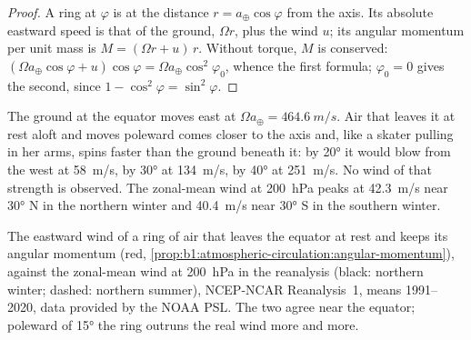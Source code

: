 \begin{proof}
A ring at  $\varphi$ is at the distance $r = a_\oplus\cos\varphi$ from the
axis. Its absolute eastward speed is that of the ground, $\Omega r$, plus the wind
$u$; its angular momentum per unit mass is $M = (\Omega r + u)\,r$. Without torque,
$M$ is conserved: $(\Omega a_\oplus\cos\varphi + u)\cos\varphi = \Omega a_\oplus
\cos^2\varphi_0$, whence the first formula; $\varphi_0 = 0$ gives the second, since
$1 - \cos^2\varphi = \sin^2\varphi$.
\end{proof}

The ground at the equator moves east at $\Omega a_\oplus = \qty{464.6}{m/s}$. Air that
leaves it at rest aloft and moves poleward comes closer to the axis and, like a
skater pulling in her arms, spins faster than the ground beneath it: by
\ang{20} it would blow from the west at \qty{58}{m/s}, by \ang{30} at
\qty{134}{m/s}, by \ang{40} at \qty{251}{m/s}. No wind of that strength is observed.
The zonal-mean wind at \qty{200}{hPa} peaks at \qty{42.3}{m/s} near \ang{30} N in the
northern winter and \qty{40.4}{m/s} near \ang{30} S in the southern winter.

\begin{omfigure}

{\small The eastward wind of a ring of air that leaves the equator at rest and keeps
its angular momentum (red, \cref{prop:b1:atmospheric-circulation:angular-momentum}),
against the zonal-mean wind at \qty{200}{hPa} in the reanalysis (black: northern
winter; dashed: northern summer), NCEP-NCAR Reanalysis~1, means 1991--2020, data
provided by the NOAA PSL. The two agree near the equator; poleward of \ang{15}
the ring outruns the real wind more and more.}
\label{fig:b1:atmospheric-circulation:angular-momentum}
\end{omfigure}

